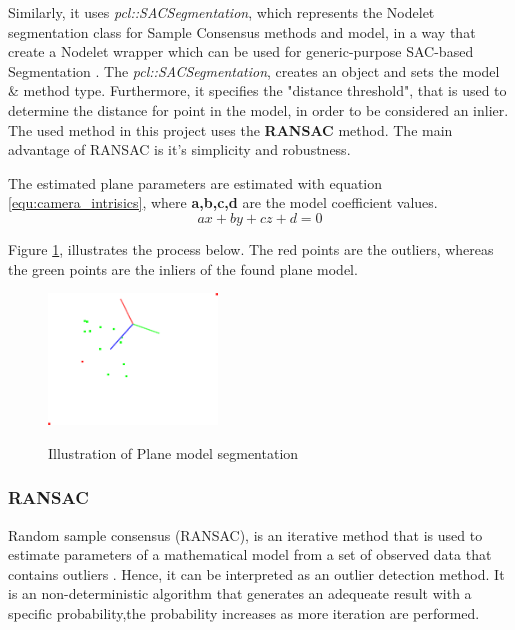 \documentclass[12pt]{report}
\begin{document}
Similarly, it uses \textit{pcl::SACSegmentation}, which represents the Nodelet segmentation class for Sample Consensus methods and model, in a way that create a Nodelet wrapper which can be used
for generic-purpose SAC-based Segmentation .
The \textit{pcl::SACSegmentation}, creates an object and sets the model \& method type. Furthermore, it specifies the "distance threshold", that is used to determine the distance for point in the model, in order to be considered an inlier.
The used method in this project uses the \textbf{RANSAC} method. The main advantage of RANSAC is it's simplicity and robustness. 

The estimated plane parameters are estimated with equation \ref{equ:camera_intrisics}, where \textbf{a,b,c,d} are the model coefficient values.
\begin{equation}
  ax + by + cz + d = 0
\end{equation}
\label{equ:plane_param}

Figure \ref{fig:plane_seg}, illustrates the process below. The red points are the outliers, whereas the green points are the inliers of the found plane model.

\begin{figure}[H]%
  \centering
  \includegraphics[width=0.4\textwidth]{planar_segmentation_2.png}
 \caption{Illustration of Plane model segmentation}\cite[]{SHCHUROVA201576}
 \label{fig:plane_seg} 
\end{figure}


\subsubsection{RANSAC}
\label{section:ransac}
Random sample consensus (RANSAC), is an iterative method that is used to estimate parameters of a mathematical model from a set of observed data that contains outliers .
Hence, it can be interpreted as an outlier detection method. It is an non-deterministic algorithm that generates an adequeate result with a specific probability,the probability increases as more iteration are performed.
\end{document}

